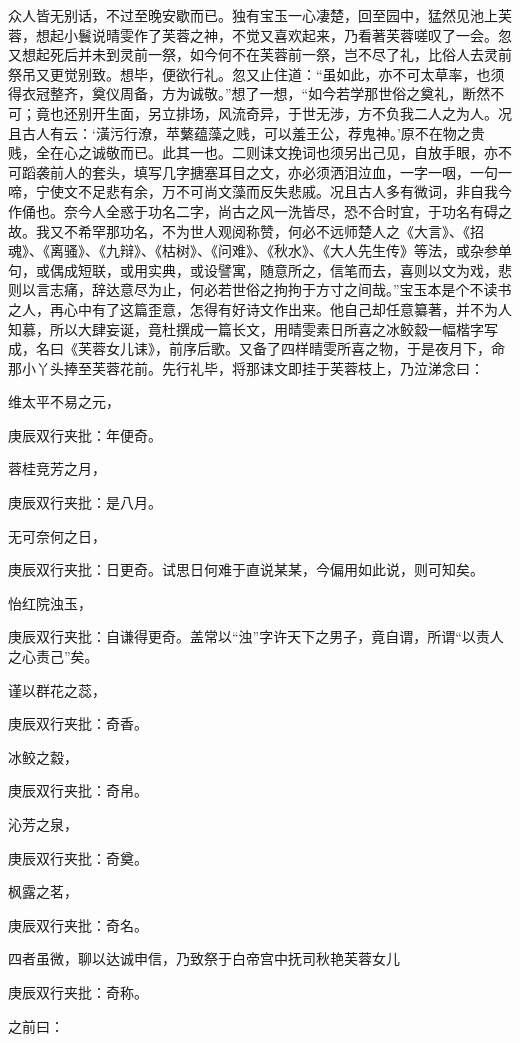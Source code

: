 \begin{parag}
    众人皆无别话，不过至晚安歇而已。独有宝玉一心凄楚，回至园中，猛然见池上芙蓉，想起小鬟说晴雯作了芙蓉之神，不觉又喜欢起来，乃看著芙蓉嗟叹了一会。忽又想起死后并未到灵前一祭，如今何不在芙蓉前一祭，岂不尽了礼，比俗人去灵前祭吊又更觉别致。想毕，便欲行礼。忽又止住道：“虽如此，亦不可太草率，也须得衣冠整齐，奠仪周备，方为诚敬。”想了一想，“如今若学那世俗之奠礼，断然不可；竟也还别开生面，另立排场，风流奇异，于世无涉，方不负我二人之为人。况且古人有云：‘潢污行潦，苹蘩蕴藻之贱，可以羞王公，荐鬼神。’原不在物之贵贱，全在心之诚敬而已。此其一也。二则诔文挽词也须另出己见，自放手眼，亦不可蹈袭前人的套头，填写几字搪塞耳目之文，亦必须洒泪泣血，一字一咽，一句一啼，宁使文不足悲有余，万不可尚文藻而反失悲戚。况且古人多有微词，非自我今作俑也。奈今人全惑于功名二字，尚古之风一洗皆尽，恐不合时宜，于功名有碍之故。我又不希罕那功名，不为世人观阅称赞，何必不远师楚人之《大言》、《招魂》、《离骚》、《九辩》、《枯树》、《问难》、《秋水》、《大人先生传》等法，或杂参单句，或偶成短联，或用实典，或设譬寓，随意所之，信笔而去，喜则以文为戏，悲则以言志痛，辞达意尽为止，何必若世俗之拘拘于方寸之间哉。”宝玉本是个不读书之人，再心中有了这篇歪意，怎得有好诗文作出来。他自己却任意纂著，并不为人知慕，所以大肆妄诞，竟杜撰成一篇长文，用晴雯素日所喜之冰鲛縠一幅楷字写成，名曰《芙蓉女儿诔》，前序后歌。又备了四样晴雯所喜之物，于是夜月下，命那小丫头捧至芙蓉花前。先行礼毕，将那诔文即挂于芙蓉枝上，乃泣涕念曰：
\end{parag}


\begin{parag}
    维太平不易之元，\begin{note}庚辰双行夹批：年便奇。\end{note}蓉桂竞芳之月，\begin{note}庚辰双行夹批：是八月。\end{note}无可奈何之日，\begin{note}庚辰双行夹批：日更奇。试思日何难于直说某某，今偏用如此说，则可知矣。\end{note}怡红院浊玉，\begin{note}庚辰双行夹批：自谦得更奇。盖常以“浊”字许天下之男子，竟自谓，所谓“以责人之心责己”矣。\end{note}谨以群花之蕊，\begin{note}庚辰双行夹批：奇香。\end{note}冰鲛之縠，\begin{note}庚辰双行夹批：奇帛。\end{note}沁芳之泉，\begin{note}庚辰双行夹批：奇奠。\end{note}枫露之茗，\begin{note}庚辰双行夹批：奇名。\end{note}四者虽微，聊以达诚申信，乃致祭于白帝宫中抚司秋艳芙蓉女儿\begin{note}庚辰双行夹批：奇称。\end{note}之前曰：
\end{parag}


